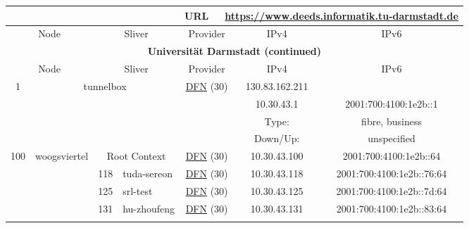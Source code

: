 \begin{small}
\begin{center}
\begin{longtable}{|c|c|c|c|c|c|c|c|}
 \multicolumn{4}{|c|}{} & \multicolumn{1}{|l|}{URL} & \multicolumn{3}{|l|}{\url{https://www.deeds.informatik.tu-darmstadt.de}} \\ \hline
 \multicolumn{2}{|p{8em}|}{Node} & \multicolumn{2}{|p{8em}|}{Sliver} & \multicolumn{2}{|p{8em}|}{Provider} & IPv4 & IPv6 \\ \hline
\endfirsthead
\hline
 \multicolumn{8}{|c|}{\textbf{Universität Darmstadt (continued)}} \\ \hline
 \multicolumn{2}{|p{8em}|}{Node} & \multicolumn{2}{|p{8em}|}{Sliver} & \multicolumn{2}{|p{8em}|}{Provider} & IPv4 & IPv6 \\ \hline
\endhead
 \multirow{4}{*}{\tiny{1}} & \multicolumn{3}{|c|}{\multirow{4}{*}{\tiny{tunnelbox}}} & \multicolumn{2}{|c|}{\multirow{4}{*}{\tiny{\href{https://www.dfn.de}{DFN} (30)}}} & \tiny{130.83.162.211} & \frownie{} \\* \cline{7-7}\cline{8-8}
  & \multicolumn{3}{|c|}{} & \multicolumn{2}{|c|}{} & \tiny{10.30.43.1} & \tiny{2001:700:4100:1e2b::1} \\* \cline{7-7}\cline{8-8}
  & \multicolumn{3}{|c|}{} & \multicolumn{2}{|c|}{} & Type: & fibre, business \\* \cline{7-7}\cline{8-8}
  & \multicolumn{3}{|c|}{} & \multicolumn{2}{|c|}{} & Down/Up:  & unspecified \\ \hline
 \multirow{21}{*}{\tiny{100}} & \multicolumn{1}{|l|}{\multirow{21}{*}{\tiny{woogsviertel}}} & \multicolumn{2}{|c|}{\tiny{Root Context}} & \multicolumn{2}{|c|}{\tiny{\href{https://www.dfn.de}{DFN} (30)}} & \tiny{10.30.43.100} & \tiny{2001:700:4100:1e2b::64} \\* \cline{3-3}\cline{4-4}\cline{5-5}\cline{6-6}\cline{7-7}\cline{8-8}
  &  & \tiny{118} & \multicolumn{1}{|l|}{\tiny{tuda-sereon}} & \multicolumn{2}{|c|}{\tiny{\href{https://www.dfn.de}{DFN} (30)}} & \tiny{10.30.43.118} & \tiny{2001:700:4100:1e2b::76:64} \\* \cline{3-3}\cline{4-4}\cline{5-5}\cline{6-6}\cline{7-7}\cline{8-8}
  &  & \tiny{125} & \multicolumn{1}{|l|}{\tiny{srl-test}} & \multicolumn{2}{|c|}{\tiny{\href{https://www.dfn.de}{DFN} (30)}} & \tiny{10.30.43.125} & \tiny{2001:700:4100:1e2b::7d:64} \\* \cline{3-3}\cline{4-4}\cline{5-5}\cline{6-6}\cline{7-7}\cline{8-8}
  &  & \tiny{131} & \multicolumn{1}{|l|}{\tiny{hu-zhoufeng}} & \multicolumn{2}{|c|}{\tiny{\href{https://www.dfn.de}{DFN} (30)}} & \tiny{10.30.43.131} & \tiny{2001:700:4100:1e2b::83:64} \\* \cline{3-3}\cline{4-4}\cline{5-5}\cline{6-6}\cline{7-7}\cline{8-8}

\end{longtable}
\end{center}
\end{small}

